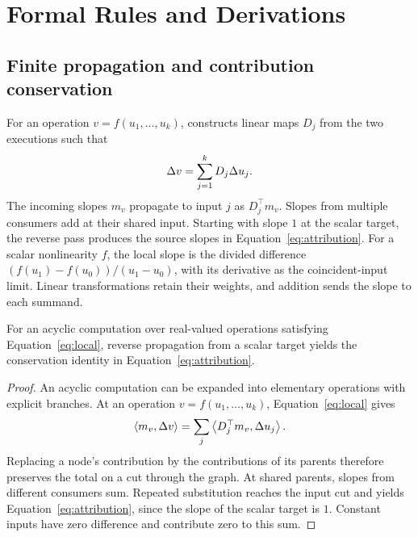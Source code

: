 \section{Formal Rules and Derivations}
\label{app:proofs}

\subsection{Finite propagation and contribution conservation}
\label{app:conservation}
For an operation $v=f(u_1,\ldots,u_k)$, \dt{} constructs linear maps $D_j$ from the two executions such that
\begin{equation}
\Delta v=\sum_{j=1}^k D_j\Delta u_j.
\label{eq:local}
\end{equation}
The incoming slopes $m_v$ propagate to input $j$ as $D_j^\top m_v$. Slopes from multiple consumers add at their shared input. Starting with slope $1$ at the scalar target, the reverse pass produces the source slopes in Equation~\ref{eq:attribution}. For a scalar nonlinearity $f$, the local slope is the divided difference $(f(u_1)-f(u_0))/(u_1-u_0)$, with its derivative as the coincident-input limit. Linear transformations retain their weights, and addition sends the slope to each summand.

\begin{theorem}
For an acyclic computation over real-valued operations satisfying Equation~\ref{eq:local}, reverse propagation from a scalar target yields the conservation identity in Equation~\ref{eq:attribution}.
\end{theorem}
\begin{proof}
An acyclic computation can be expanded into elementary operations with explicit branches. At an operation $v=f(u_1,\ldots,u_k)$, Equation~\ref{eq:local} gives
\begin{equation}
\left\langle m_v,\Delta v\right\rangle=\sum_j\left\langle D_j^\top m_v,\Delta u_j\right\rangle.
\end{equation}
Replacing a node's contribution by the contributions of its parents therefore preserves the total on a cut through the graph. At shared parents, slopes from different consumers sum. Repeated substitution reaches the input cut and yields Equation~\ref{eq:attribution}, since the slope of the scalar target is $1$. Constant inputs have zero difference and contribute zero to this sum.

\end{proof}


